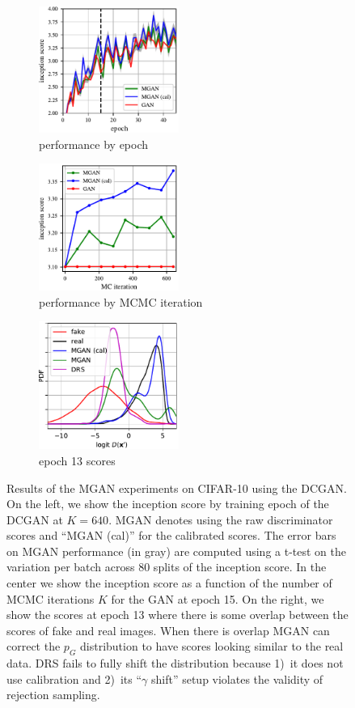 \documentclass{article}
\newcommand{\PG}{{p_G}}
\begin{document}
\begin{figure}
    \centering
    \begin{subfigure}[b]{0.32\textwidth}
       \centering
       \includegraphics[width=1.8in]{figures/per_epoch.pdf}
       \caption{performance by epoch}
       \label{fig:incep_by_epoch}
    \end{subfigure}
    \begin{subfigure}[b]{0.32\textwidth}
       \centering
       \includegraphics[width=1.8in]{figures/plot_per_mh.pdf}
       \caption{performance by MCMC iteration}
       \label{fig:incep_by_iter}
    \end{subfigure}
    \begin{subfigure}[b]{0.32\textwidth}
       \centering
       \includegraphics[width=1.8in]{figures/score_dist_overlap.pdf}
       \caption{epoch 13 scores}
       \label{fig:score_dist_overlap}
    \end{subfigure}
    \caption{{\small
    Results of the MGAN experiments on CIFAR-10 using the DCGAN\@.
    On the left, we show the inception score by training epoch of the DCGAN at $K=640$.
    MGAN denotes using the raw discriminator scores and ``MGAN (cal)'' for the calibrated scores.
    The error bars on MGAN performance (in gray) are computed using a t-test on the variation per batch across 80 splits of the inception score.
    In the center we show the inception score as a function of the number of MCMC iterations $K$ for the GAN at epoch 15.
    On the right, we show the scores at epoch 13 where there is some overlap between the scores of fake and real images.
    When there is overlap MGAN can correct the $\PG$ distribution to have scores looking similar to the real data.
    DRS fails to fully shift the distribution because 1)~it does not use calibration and 2)~its ``$\gamma$ shift'' setup violates the validity of rejection sampling.
    }}
\end{figure}
\end{document}
